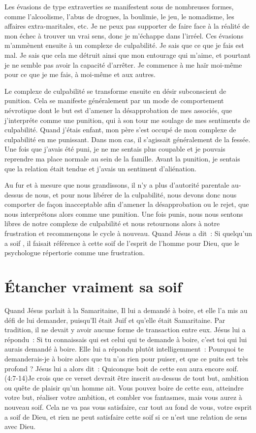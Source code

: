Les évasions de type extraverties se manifestent sous de nombreuses formes,
 comme l'alcoolisme, l'abus de drogues, la boulimie, le jeu, le nomadisme,
 les affaires extra-maritales, etc.
 Je ne peux pas supporter de faire face à la réalité de mon échec à trouver
 un vrai sens, donc je m'échappe dans l'irréel.
 Ces évasions m'ammènent ensuite à un complexe de culpabilité.
 Je sais que ce que je fais est mal. Je sais que cela me détruit
 ainsi que mon entourage qui m'aime, et pourtant je ne semble pas avoir
 la capacité d'arrêter. Je commence à me haïr moi-même pour ce que je me fais,
 à moi-même et aux autres.

Le complexe de culpabilité se transforme ensuite en désir subconscient
 de punition. Cela se manifeste généralement par un mode de comportement
 névrotique dont le but est d'amener la désapprobation de mes associés,
 que j'interpréte comme une punition, qui à son tour me soulage
 de mes sentiments de culpabilité. Quand j'étais enfant, mon père
 s'est occupé de mon complexe de culpabilité en me punissant.
 Dans mon cas, il s'agissait généralement de la fessée.
 Une fois que j'avais été puni, je ne me sentais plus coupable
 et je pouvais reprendre ma place normale au sein de la famille.
 Avant la punition, je sentais que la relation était tendue et j'avais
 un sentiment d'aliénation.

Au fur et à mesure que nous grandissons, il n'y a plus d'autorité parentale
 au-dessus de nous, et pour nous libérer de la culpabilité, nous devons donc
 nous comporter de façon inacceptable afin d'amener la désapprobation
 ou le rejet, que nous interprétons alors comme une punition.
 Une fois punis, nous nous sentons libres de notre complexe de culpabilité
 et nous retournons alors à notre frustration et recommençons le cycle
 à nouveau. Quand Jésus a dit~: \og Si quelqu'un a soif \fg{},
 il faisait référence à cette soif de l'esprit de l'homme pour Dieu,
 que le psychologue répertorie comme une frustration.


\section{\'Etancher vraiment sa soif}

Quand Jésus parlait à la Samaritaine, Il lui a demandé à boire,
 et elle l'a mis au défi de lui demander, puisqu'Il était Juif
 et qu'elle était Samaritaine. Par tradition, il ne devait y avoir
 aucune forme de transaction entre eux. Jésus lui a répondu~:
 \og Si tu connaissais qui est celui qui te demande à boire,
 c'est toi qui lui aurais demandé à boire. \fg{}
 Elle lui a répondu plutôt intelligemment~:
 \og Pourquoi te demanderais-je à boire alors que tu n'as rien pour puiser,
 et que ce puits est très profond ? \fg{} Jésus lui a alors dit~:
 \og Quiconque boit de cette eau aura encore soif. \fg{}
 (4:7-14)Je crois que ce verset devrait être inscrit
 au-dessus de tout but,
 ambition ou quête de plaisir qu'un homme ait.
 Vous pouvez boire de cette eau, atteindre votre but, réaliser votre ambition,
 et combler vos fantasmes, mais vous aurez à nouveau soif.
 Cela ne va pas vous satisfaire, car tout au fond de vous,
 votre esprit a soif de Dieu, et rien ne peut satisfaire cette soif
 si ce n'est une relation de sens avec Dieu.

